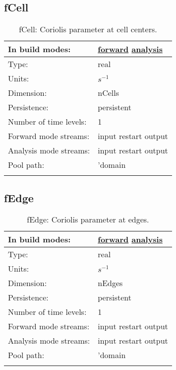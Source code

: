 \subsection[fCell]{fCell}
\label{subsec:var_sec_mesh_fCell}
\begin{center}
\begin{longtable}{| p{2.0in} | p{4.0in} |}
        \hline 
        In build modes: & \hyperref[subsec:forward_var_tab_mesh]{forward} \hyperref[subsec:analysis_var_tab_mesh]{analysis} \\
        \hline 
        Type: & real \\
        \hline 
        Units: & $s^{-1}$ \\
        \hline 
        Dimension: & nCells \\
        \hline 
        Persistence: & persistent \\
        \hline 
        Number of time levels: & 1 \\
        \hline 
		 Forward mode streams: &  input restart output \\
        \hline 
		 Analysis mode streams: &  input restart output \\
        \hline 
            Pool path: & 'domain %
 \\
		 \hline 
    \caption{fCell: Coriolis parameter at cell centers.}
\end{longtable}
\end{center}
\subsection[fEdge]{fEdge}
\label{subsec:var_sec_mesh_fEdge}
\begin{center}
\begin{longtable}{| p{2.0in} | p{4.0in} |}
        \hline 
        In build modes: & \hyperref[subsec:forward_var_tab_mesh]{forward} \hyperref[subsec:analysis_var_tab_mesh]{analysis} \\
        \hline 
        Type: & real \\
        \hline 
        Units: & $s^{-1}$ \\
        \hline 
        Dimension: & nEdges \\
        \hline 
        Persistence: & persistent \\
        \hline 
        Number of time levels: & 1 \\
        \hline 
		 Forward mode streams: &  input restart output \\
        \hline 
		 Analysis mode streams: &  input restart output \\
        \hline 
            Pool path: & 'domain %
 \\
		 \hline 
    \caption{fEdge: Coriolis parameter at edges.}
\end{longtable}
\end{center}

